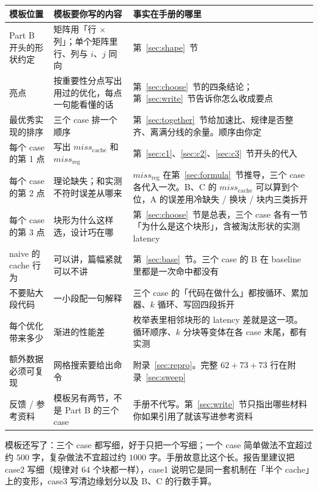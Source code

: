 \documentclass[11pt,a4paper,fontset=fandol]{ctexart}
\newcommand{\mreg}{\mathit{miss}_{\mathrm{reg}}}
\newcommand{\mc}{\mathit{miss}_{\mathrm{cache}}}
\begin{document}
\begin{center}
\small
\setlength{\tabcolsep}{4pt}
\begin{tabular}{@{}p{3.6cm}p{5.6cm}p{5.4cm}@{}}
\toprule
模板位置 & 模板要你写的内容 & 事实在手册的哪里\\
\midrule
Part B 开头的形状约定 & 矩阵用「行 $\times$ 列」；单个矩阵里行、列与 $i$、$j$ 同向 & 第~\ref{sec:shape}~节\\
亮点 & 按重要性分点写出用过的优化，每点一句能看懂的话 & 第~\ref{sec:choose}~节的四条结论；第~\ref{sec:write}~节告诉你怎么收成要点\\
最优秀实现的排序 & 三个 case 排一个顺序 & 第~\ref{sec:together}~节给加速比、规律是否整齐、离满分线的余量。顺序由你定\\
每个 case 的第 1 点 & 写出 $\mc$ 和 $\mreg$ & 第~\ref{sec:c1}、\ref{sec:c2}、\ref{sec:c3}~节开头的代入\\
每个 case 的第 2 点 & 理论缺失；和实测不符时误差从哪来 & $\mreg$ 在第~\ref{sec:formula}~节推导，三个 case 各代入一次。B、C 的 $\mc$ 可以算到个位，A 的误差用冷缺失 / 换块 / 块内三类拆开\\
每个 case 的第 3 点 & 块形为什么这样选，设计巧在哪 & 第~\ref{sec:choose}~节是总表，三个 case 各有一节「为什么是这个块形」，含被淘汰形状的实测 latency\\
naive 的 cache 行为 & 可以讲，篇幅紧就可以不讲 & 第~\ref{sec:base}~节。三个 case 的 B 在 baseline 里都是一次命中都没有\\
不要贴大段代码 & 一小段配一句解释 & 三个 case 的「代码在做什么」都按循环、累加器、$k$ 循环、写回四段拆开\\
每个优化带来多少 & 渐进的性能差 & 枚举表里相邻块形的 latency 差就是这一项。循环顺序、$k$ 分块等变体在各 case 末尾，都有实测\\
额外数据必须可复现 & 网格搜索要给出命令 & 附录~\ref{sec:repro}。完整 $62+73+73$ 行在附录~\ref{sec:sweep}\\
反馈 / 参考资料 & 模板另有两节，不是 Part B 的三个 case & 手册不代写。第~\ref{sec:write}~节只指出哪些材料你如果引用了就该写进参考资料\\
\bottomrule
\end{tabular}
\end{center}

模板还写了：三个 case 都写细，好于只把一个写细；一个 case 简单做法不宜超过约 $500$ 字，复杂做法不宜超过约 $1000$ 字。手册故意比这个长。报告里建议把 case2 写细（规律对 $64$ 个块都一样），case1 说明它是同一套机制在「半个 cache」上的变形，case3 写清边缘划分以及 B、C 的行数手算。
\end{document}
